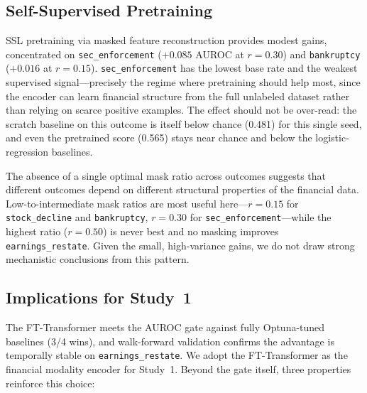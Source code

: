 \subsection{Self-Supervised Pretraining}
\label{sec:disc_ssl}

SSL pretraining via masked feature reconstruction provides modest gains, concentrated on \texttt{sec\_enforcement} ($+0.085$ AUROC at $r = 0.30$) and \texttt{bankruptcy} ($+0.016$ at $r = 0.15$). \texttt{sec\_enforcement} has the lowest base rate and the weakest supervised signal---precisely the regime where pretraining should help most, since the encoder can learn financial structure from the full unlabeled dataset rather than relying on scarce positive examples. The effect should not be over-read: the scratch baseline on this outcome is itself below chance (0.481) for this single seed, and even the pretrained score (0.565) stays near chance and below the logistic-regression baselines.

The absence of a single optimal mask ratio across outcomes suggests that different outcomes depend on different structural properties of the financial data. Low-to-intermediate mask ratios are most useful here---$r = 0.15$ for \texttt{stock\_decline} and \texttt{bankruptcy}, $r = 0.30$ for \texttt{sec\_enforcement}---while the highest ratio ($r = 0.50$) is never best and no masking improves \texttt{earnings\_restate}. Given the small, high-variance gains, we do not draw strong mechanistic conclusions from this pattern.

\subsection{Implications for Study~1}
\label{sec:disc_study1}

The FT-Transformer meets the AUROC gate against fully Optuna-tuned baselines (3/4 wins), and walk-forward validation confirms the advantage is temporally stable on \texttt{earnings\_restate}. We adopt the FT-Transformer as the financial modality encoder for Study~1. Beyond the gate itself, three properties reinforce this choice:

